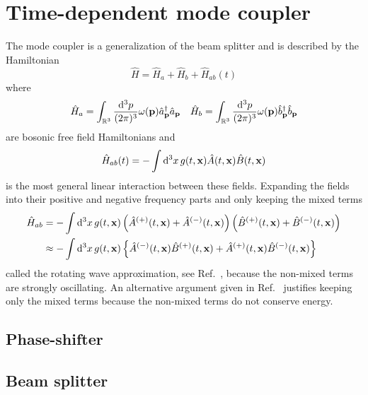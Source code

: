 \section{Time-dependent mode coupler}

The mode coupler is a generalization of the beam splitter and is described by the Hamiltonian
\begin{equation}
	\hat{H}
	=
	\hat{H}_a
	+
	\hat{H}_b
	+
	\hat{H}_{ab}(t)
\end{equation}
where
\begin{align}
	\hat{H}_a
	=
	\int_{\mathbb{R}^3}\frac{\dd[3]{p}}{(2\pi)^3}
	\omega(\vb{p})
	\hat{a}_{\vb{p}}^\dagger
	\hat{a}_{\vb{p}}
	&&
	\hat{H}_b
	=
	\int_{\mathbb{R}^3}\frac{\dd[3]{p}}{(2\pi)^3}
	\omega(\vb{p})
	\hat{b}_{\vb{p}}^\dagger
	\hat{b}_{\vb{p}}
\end{align}
are bosonic free field Hamiltonians and
\begin{equation}
	\hat{H}_{ab}(t)
	=
	-
	\int\dd[3]{x}
	g(t,\vb{x})
	\hat{A}(t,\vb{x})
	\hat{B}(t,\vb{x})
\end{equation}
is the most general linear interaction between these fields.
Expanding the fields into their positive and negative frequency parts and only keeping the mixed terms
\begin{equation}
	\begin{split}
		\hat{H}_{ab}
		&=
		-
		\int\dd[3]{x}
		g(t,\vb{x})
		\left(
			\hat{A}^{(+)}(t,\vb{x})
			+
			\hat{A}^{(-)}(t,\vb{x})
		\right)
		\left(
			\hat{B}^{(+)}(t,\vb{x})
			+
			\hat{B}^{(-)}(t,\vb{x})
		\right)
		\\
		&\approx
		-
		\int\dd[3]{x}
		g(t,\vb{x})
		\left\{
			\hat{A}^{(-)}(t,\vb{x})
			\hat{B}^{(+)}(t,\vb{x})
			+
			\hat{A}^{(+)}(t,\vb{x})
			\hat{B}^{(-)}(t,\vb{x})
		\right\}
	\end{split}
\end{equation}
called the rotating wave approximation, see Ref.~\cite[p.~158]{Gardiner2000}, because the non-mixed terms are strongly oscillating.
An alternative argument given in Ref.~\cite[p.~127]{Haroche2006} justifies keeping only the mixed terms because the non-mixed terms do not conserve energy.

\subsection{Phase-shifter}

\subsection{Beam splitter}